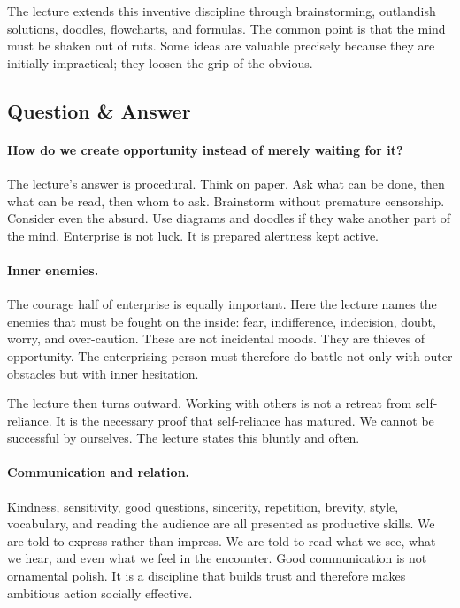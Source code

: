 The lecture extends this inventive discipline through brainstorming, outlandish solutions, doodles, flowcharts, and formulas. The common point is that the mind must be shaken out of ruts. Some ideas are valuable precisely because they are initially impractical; they loosen the grip of the obvious.

\subsection{Question \& Answer}

\paragraph{How do we create opportunity instead of merely waiting for it?}
The lecture's answer is procedural. Think on paper. Ask what can be done, then what can be read, then whom to ask. Brainstorm without premature censorship. Consider even the absurd. Use diagrams and doodles if they wake another part of the mind. Enterprise is not luck. It is prepared alertness kept active.

\paragraph{Inner enemies.}
The courage half of enterprise is equally important. Here the lecture names the enemies that must be fought on the inside: fear, indifference, indecision, doubt, worry, and over-caution. These are not incidental moods. They are thieves of opportunity. The enterprising person must therefore do battle not only with outer obstacles but with inner hesitation.

The lecture then turns outward. Working with others is not a retreat from self-reliance. It is the necessary proof that self-reliance has matured. We cannot be successful by ourselves. The lecture states this bluntly and often.

\paragraph{Communication and relation.}
Kindness, sensitivity, good questions, sincerity, repetition, brevity, style, vocabulary, and reading the audience are all presented as productive skills. We are told to express rather than impress. We are told to read what we see, what we hear, and even what we feel in the encounter. Good communication is not ornamental polish. It is a discipline that builds trust and therefore makes ambitious action socially effective.

